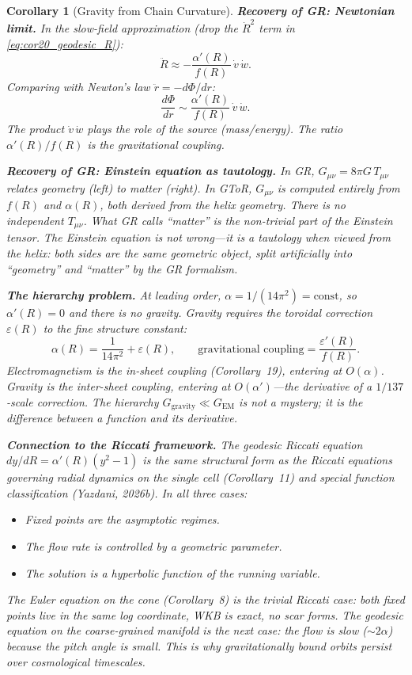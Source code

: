 \documentclass[12pt]{amsart}
\newtheorem{corollary}{Corollary}
\begin{document}
\begin{corollary}[Gravity from Chain Curvature]
\medskip
\textbf{Recovery of GR: Newtonian limit.}  In the slow-field approximation (drop the
$\dot{R}^2$ term in \eqref{eq:cor20_geodesic_R}):
\[
  \ddot{R} \approx -\frac{\alpha'(R)}{f(R)}\, \dot{v}\, \dot{w}.
\]
Comparing with Newton's law $\ddot{r} = -d\Phi/dr$:
\[
  \frac{d\Phi}{dr} \sim \frac{\alpha'(R)}{f(R)}\, \dot{v}\, \dot{w}.
\]
The product $\dot{v}\, \dot{w}$ plays the role of the source (mass/energy).  The ratio
$\alpha'(R)/f(R)$ is the gravitational coupling.

\medskip
\textbf{Recovery of GR: Einstein equation as tautology.}  In GR, $G_{\mu\nu} =
8\pi G\, T_{\mu\nu}$ relates geometry (left) to matter (right).  In GToR, $G_{\mu\nu}$ is
computed entirely from $f(R)$ and $\alpha(R)$, both derived from the helix geometry.
There is no independent $T_{\mu\nu}$.  What GR calls ``matter'' is the non-trivial part of
the Einstein tensor.  The Einstein equation is not wrong---it is a \emph{tautology} when
viewed from the helix: both sides are the same geometric object, split artificially into
``geometry'' and ``matter'' by the GR formalism.

\medskip
\textbf{The hierarchy problem.}  At leading order, $\alpha = 1/(14\pi^2) = \text{const}$,
so $\alpha'(R) = 0$ and there is no gravity.  Gravity requires the toroidal correction
$\varepsilon(R)$ to the fine structure constant:
\[
  \alpha(R) = \frac{1}{14\pi^2} + \varepsilon(R), \qquad
  \text{gravitational coupling} = \frac{\varepsilon'(R)}{f(R)}.
\]
Electromagnetism is the in-sheet coupling (Corollary~19), entering at $O(\alpha)$.
Gravity is the inter-sheet coupling, entering at $O(\alpha')$---the derivative of a
$1/137$-scale correction.  The hierarchy $G_{\text{gravity}} \ll G_{\text{EM}}$ is not a
mystery; it is the difference between a function and its derivative.

\medskip
\textbf{Connection to the Riccati framework.}  The geodesic Riccati equation
$dy/dR = \alpha'(R)(y^2 - 1)$ is the same structural form as the Riccati equations
governing radial dynamics on the single cell (Corollary~11) and special function
classification (Yazdani, 2026b).  In all three cases:
\begin{itemize}
\item Fixed points are the asymptotic regimes.
\item The flow rate is controlled by a geometric parameter.
\item The solution is a hyperbolic function of the running variable.
\end{itemize}
The Euler equation on the cone (Corollary~8) is the \emph{trivial} Riccati case: both
fixed points live in the same log coordinate, WKB is exact, no scar forms.  The geodesic
equation on the coarse-grained manifold is the next case: the flow is slow ($\sim 2\alpha$)
because the pitch angle is small.  This is why gravitationally bound orbits persist over
cosmological timescales.


\end{corollary}
\end{document}
